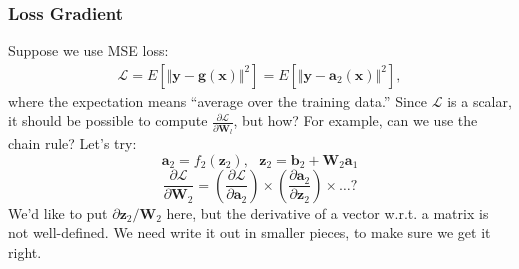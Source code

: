 \documentclass{beamer}
\begin{document}
\begin{frame}
  \frametitle{Loss Gradient}

  Suppose we use MSE loss:
  \begin{align*}
    \mathcal{L} =E\left[\Vert\mathbf{y}-\mathbf{g}(\mathbf{x})\Vert^2\right]
    =E\left[\Vert\mathbf{y}-\mathbf{a}_2(\mathbf{x})\Vert^2\right],
  \end{align*}
  where the expectation means ``average over the training data.''
  Since $\mathcal{L}$ is a scalar, it should be possible to compute
  $\frac{\partial\mathcal{L}}{\partial\mathbf{W}_l}$, but how?  For
  example, can we use the chain rule?  Let's try:
  \begin{displaymath}
    \mathbf{a}_2 = f_2\left(\mathbf{z}_2\right),~~~
    \mathbf{z}_2=\mathbf{b}_2+\mathbf{W}_2\mathbf{a}_1
  \end{displaymath}
  \begin{displaymath}
    \frac{\partial\mathcal{L}}{\partial\mathbf{W}_2}=
    \left(\frac{\partial\mathcal{L}}{\partial\mathbf{a}_2}\right)\times
    \left(\frac{\partial\mathbf{a}_2}{\partial\mathbf{z}_2}\right)\times\ldots\textbf{?}
  \end{displaymath}
  We'd like to put $\partial\mathbf{z}_2/\mathbf{W}_2$ here, but the
  derivative of a vector w.r.t. a matrix is not well-defined.  We need
  write it out in smaller pieces, to make sure we get it right.
\end{frame}
\end{document}

